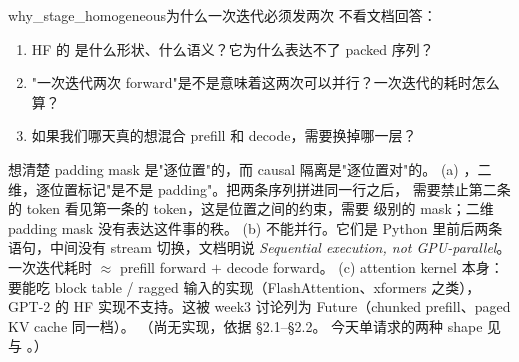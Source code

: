 \begin{checkpoint}{why_stage_homogeneous}{为什么一次迭代必须发两次 }
不看文档回答：
\begin{enumerate}[label=(\alph*)]
  \item HF 的  是什么形状、什么语义？它为什么表达不了 packed 序列？
  \item "一次迭代两次 forward"是不是意味着这两次可以并行？一次迭代的耗时怎么算？
  \item 如果我们哪天真的想混合 prefill 和 decode，需要换掉哪一层？
\end{enumerate}
\hint 想清楚 padding mask 是"逐位置"的，而 causal 隔离是"逐位置对"的。
\ifshowanswers
\tcblower
\answer (a) ，二维，逐位置标记"是不是 padding"。把两条序列拼进同一行之后，
需要禁止第二条的 token 看见第一条的 token，这是位置之间的约束，需要 \code{[S, S]} 级别的
mask；二维 padding mask 没有表达这件事的秩。
(b) 不能并行。它们是 Python 里前后两条语句，中间没有 stream 切换，文档明说
\emph{Sequential execution, not GPU-parallel}。一次迭代耗时 $\approx$ prefill forward $+$ decode forward。
(c) attention kernel 本身：要能吃 block table / ragged 输入的实现（FlashAttention、xformers 之类），
GPT-2 的 HF 实现不支持。这被 week3 讨论列为 Future（chunked prefill、paged KV cache 同一档）。
\whereincode （尚无实现，依据  §2.1--§2.2。
今天单请求的两种 shape 见  与
。）
\fi
\end{checkpoint}

